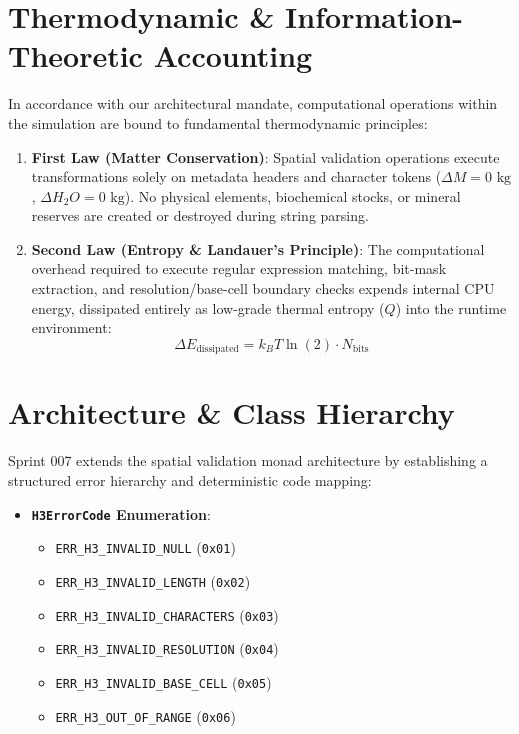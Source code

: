 \documentclass[11pt, a4paper]{article}
\begin{document}
\section{Thermodynamic \& Information-Theoretic Accounting}
In accordance with our architectural mandate, computational operations within the simulation are bound to fundamental thermodynamic principles:
\begin{enumerate}
    \item \textbf{First Law (Matter Conservation)}: Spatial validation operations execute transformations solely on metadata headers and character tokens ($\Delta M = 0\text{ kg}$, $\Delta H_2O = 0\text{ kg}$). No physical elements, biochemical stocks, or mineral reserves are created or destroyed during string parsing.
    \item \textbf{Second Law (Entropy \& Landauer's Principle)}: The computational overhead required to execute regular expression matching, bit-mask extraction, and resolution/base-cell boundary checks expends internal CPU energy, dissipated entirely as low-grade thermal entropy ($Q$) into the runtime environment:
    \begin{equation}
        \Delta E_{\text{dissipated}} = k_B T \ln(2) \cdot N_{\text{bits}}
    \end{equation}
\end{enumerate}

\section{Architecture \& Class Hierarchy}
Sprint 007 extends the spatial validation monad architecture by establishing a structured error hierarchy and deterministic code mapping:

\begin{itemize}
    \item \textbf{\texttt{H3ErrorCode} Enumeration}:
    \begin{itemize}
        \item \texttt{ERR\_H3\_INVALID\_NULL} (\texttt{0x01})
        \item \texttt{ERR\_H3\_INVALID\_LENGTH} (\texttt{0x02})
        \item \texttt{ERR\_H3\_INVALID\_CHARACTERS} (\texttt{0x03})
        \item \texttt{ERR\_H3\_INVALID\_RESOLUTION} (\texttt{0x04})
        \item \texttt{ERR\_H3\_INVALID\_BASE\_CELL} (\texttt{0x05})
        \item \texttt{ERR\_H3\_OUT\_OF\_RANGE} (\texttt{0x06})
    \end{itemize}
\end{itemize}
\end{document}
